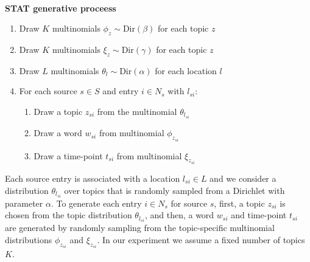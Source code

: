\documentclass[twoside,leqno,twocolumn]{article}
\newcommand{\model}{{STAT}\xspace} %
\begin{document}
\vspace{-10pt}\ \\{\bf \model generative proceess}
\begin{enumerate}[noitemsep]
\item Draw $K$ multinomials $\phi_z\sim\mbox{Dir}(\beta)$ for each topic $z$
\item Draw $K$ multinomials $\xi_z\sim\mbox{Dir}(\gamma)$ for each topic $z$
\item Draw $L$ multinomials $\theta_l\sim\mbox{Dir}(\alpha)$ for each location $l$
\item For each source  $s \in S$ and entry $i \in N_s$ with $l_{si}$:
\begin{enumerate}
\item Draw a topic $z_{si}$ from the multinomial $\theta_{l_{si}}$
\item Draw a word $w_{si}$ from multinomial $\phi_{z_{si}}$
\item Draw a time-point $t_{si}$ from multinomial $\xi_{z_{si}}$
\end{enumerate}
\end{enumerate}

Each source entry is associated with a location $l_{si} \in L$ and we consider a distribution $\theta_{l_{si}}$ over topics that is randomly sampled from a Dirichlet with parameter $\alpha$. To generate each entry $i \in N_s$ for source $s$, first, a topic $z_{si}$ is chosen from the topic distribution $\theta_{l_{si}}$, and then, a word $w_{si}$ and time-point $t_{si}$ are generated by randomly sampling from the topic-specific multinomial distributions $\phi_{z_{si}}$ and $\xi_{z_{si}}$.  In our experiment we assume a fixed number of topics $K$.
\end{document}
